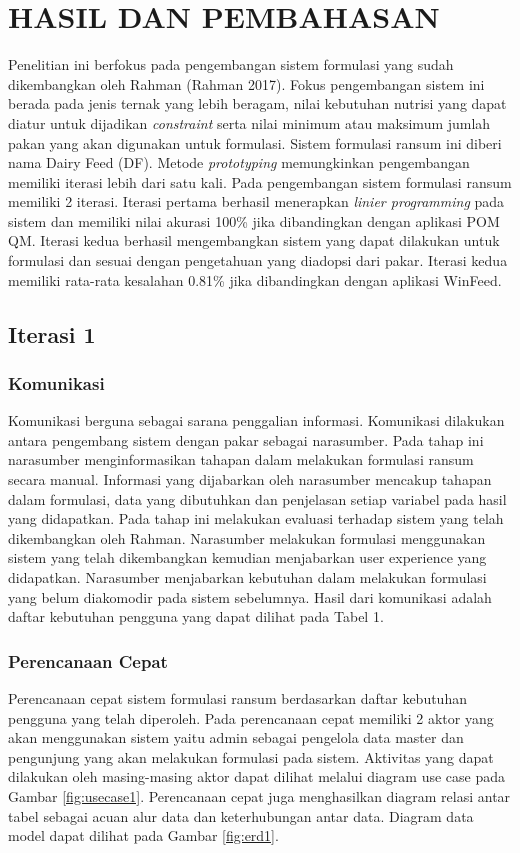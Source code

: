 \section*{HASIL DAN PEMBAHASAN}
Penelitian ini berfokus pada pengembangan sistem formulasi yang sudah dikembangkan oleh Rahman (Rahman 2017). Fokus pengembangan sistem ini berada pada jenis ternak yang lebih beragam, nilai kebutuhan nutrisi yang dapat diatur untuk dijadikan \textit{constraint }serta nilai minimum atau maksimum jumlah pakan yang akan digunakan untuk formulasi. Sistem formulasi ransum ini diberi nama Dairy Feed (DF). Metode \textit{prototyping }memungkinkan pengembangan memiliki iterasi lebih dari satu kali. Pada pengembangan sistem formulasi ransum memiliki 2 iterasi. Iterasi pertama berhasil menerapkan \textit{linier programming }pada sistem dan memiliki nilai akurasi 100\% jika dibandingkan dengan aplikasi POM QM. Iterasi kedua berhasil mengembangkan sistem yang dapat dilakukan untuk formulasi dan sesuai dengan pengetahuan yang diadopsi dari pakar. Iterasi kedua memiliki rata-rata kesalahan 0.81\% jika dibandingkan dengan aplikasi WinFeed.

\subsection*{Iterasi 1}
\subsubsection*{Komunikasi}
Komunikasi berguna sebagai sarana penggalian informasi. Komunikasi dilakukan antara pengembang sistem dengan pakar sebagai narasumber. Pada tahap ini narasumber menginformasikan tahapan dalam melakukan formulasi ransum secara manual. Informasi yang dijabarkan oleh narasumber mencakup tahapan dalam formulasi, data yang dibutuhkan dan penjelasan setiap variabel pada hasil yang didapatkan. Pada tahap ini melakukan evaluasi terhadap sistem yang telah dikembangkan oleh Rahman. Narasumber melakukan formulasi menggunakan sistem yang telah dikembangkan kemudian menjabarkan user experience yang didapatkan. Narasumber menjabarkan kebutuhan dalam melakukan formulasi yang belum diakomodir pada sistem sebelumnya. Hasil dari komunikasi adalah daftar kebutuhan pengguna yang dapat dilihat pada Tabel 1.

\subsubsection*{Perencanaan Cepat} 
Perencanaan cepat sistem formulasi ransum berdasarkan daftar kebutuhan pengguna yang telah diperoleh. Pada perencanaan cepat memiliki 2 aktor yang akan menggunakan sistem yaitu admin sebagai pengelola data master dan pengunjung yang akan melakukan formulasi pada sistem. Aktivitas yang dapat dilakukan oleh masing-masing aktor dapat dilihat melalui diagram use case pada Gambar \ref{fig:usecase1}. Perencanaan cepat juga menghasilkan diagram relasi antar tabel sebagai acuan alur data dan keterhubungan antar data. Diagram data model dapat dilihat pada Gambar \ref{fig:erd1}.

